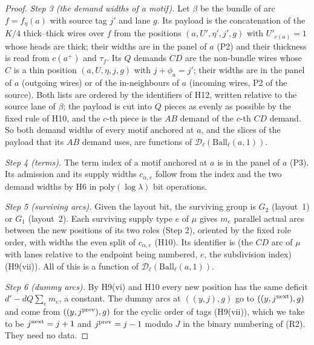 \documentclass[11pt]{article}
\theoremstyle{definition}
\theoremstyle{remark}
\newcommand{\Ball}{\mathrm{Ball}}
\begin{document}
\begin{proof}
\emph{Step 3 (the demand widths of a motif).} Let $\beta$ be the bundle of arc $f=f_\eta(a)$ with source tag $j'$ and lane $g$.
Its payload is the concatenation of the $K/4$ thick--thick wires over $f$ from the positions $(a,U',\eta',j',g)$ with
$U'_{c(a)}=1$ whose heads are thick; their widths are in the panel of $a$ (P2) and their thickness is read from $c(a^+)$ and
$\tau_f$. Its $Q$ demands $CD$ are the non-bundle wires whose $C$ is a thin position $(a,U,\eta,j,g)$ with $j+\phi_a=j'$; their
widths are in the panel of $a$ (outgoing wires) or of the in-neighbours of $a$ (incoming wires, P2 of the source). Both lists are
ordered by the identifiers of H12, written relative to the source lane of $\beta$; the payload is cut into $Q$ pieces as evenly as
possible by the fixed rule of H10, and the $c$-th piece is the $AB$ demand of the $c$-th $CD$ demand. So both demand widths of every
motif anchored at $a$, and the slices of the payload that its $AB$ demand uses, are functions of $\mathcal D_\ell(\Ball_\ell(a,1))$.

\emph{Step 4 (terms).} The term index of a motif anchored at $a$ is in the panel of $a$ (P3). Its admission and its supply widths
$c_{\alpha,e}$ follow from the index and the two demand widths by H6 in $\mathrm{poly}(\log\lambda)$ bit operations.

\emph{Step 5 (surviving arcs).} Given the layout bit, the surviving group is $G_2$ (layout~1) or $G_1$ (layout~2). Each surviving
supply type $e$ of $\mu$ gives $m_e$ parallel actual arcs between the new positions of its two roles (Step 2), oriented by the
fixed role order, with widths the even split of $c_{\alpha,e}$ (H10). Its identifier is (the $CD$ arc of $\mu$ with lanes relative
to the endpoint being numbered, $e$, the subdivision index) (H9(vii)). All of this is a function of
$\mathcal D_\ell(\Ball_\ell(a,1))$.

\emph{Step 6 (dummy arcs).} By H9(vi) and H10 every new position has the same deficit $d'-dQ\sum_em_e$, a constant. The dummy arcs
at $((y,j),g)$ go to $((y,j^{\rm next}),g)$ and come from $((y,j^{\rm prev}),g)$ for the cyclic order of tags (H9(vii)), which we take to be $j^{\rm next}=j+1$ and $j^{\rm prev}=j-1$ modulo $J$ in the binary
numbering of (R2).
They need no data.


\end{proof}
\end{document}
